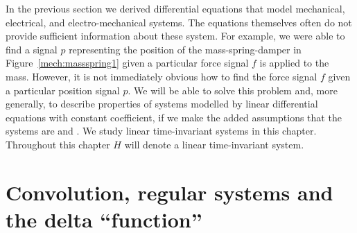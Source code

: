 
In the previous section we derived differential equations that model mechanical, electrical, and electro-mechanical systems.  The equations themselves often do not provide sufficient information about these system.  For example, we were able to find a signal $p$ representing the position of the mass-spring-damper in Figure~\ref{mech:massspring1} given a particular force signal $f$ is applied to the mass.  However, it is not immediately obvious how to find the force signal $f$ given a particular position signal $p$.  We will be able to solve this problem and, more generally, to describe properties of systems modelled by linear differential equations with constant coefficient, if we make the added assumptions that the systems are  and .  We study linear time-invariant systems in this chapter.  Throughout this chapter $H$ will denote a linear time-invariant system.

\section{Convolution, regular systems and the delta ``function''} \label{sec:conv-regul-syst}

